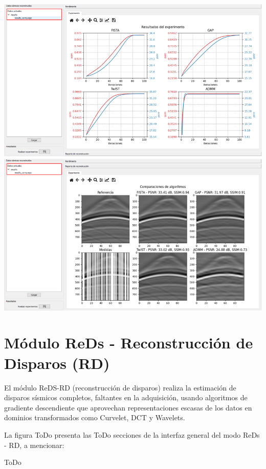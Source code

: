 \documentclass[12pt,twoside,letter]{ol-softwaremanual}
\newenvironment{Figure}
  {\par\medskip\noindent\minipage{\linewidth}}
  {\endminipage\par\medskip}
\begin{document}
\begin{Figure}
	\centering
	\includegraphics[width=1\linewidth]{report-6.png}
	\label{fig:report_6}
\end{Figure}

\newpage
\section{Módulo ReDs - Reconstrucción de Disparos (RD)}

El módulo ReDS-RD (reconstrucción de disparos) realiza la estimación de disparos sísmicos completos, faltantes en la adquisición, usando algoritmos de gradiente descendiente que aprovechan representaciones escasas de los datos en dominios transformados como Curvelet, DCT y Wavelets.

{\color{red}La figura ToDo presenta las ToDo secciones de la interfaz general del modo ReDs - RD, a mencionar:
	
	ToDo}
\end{document}
